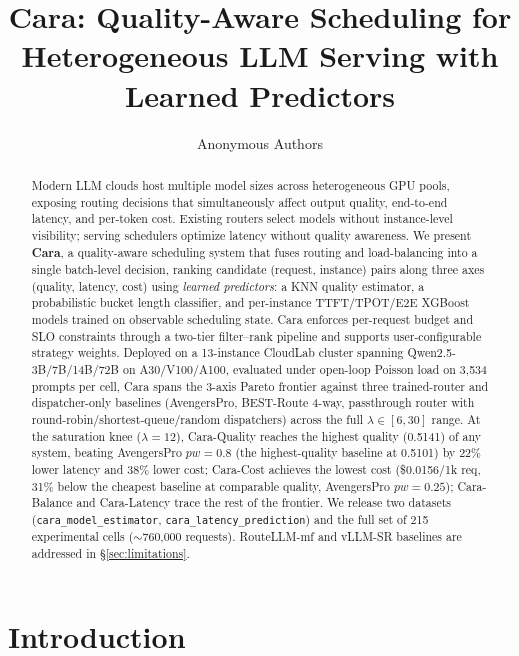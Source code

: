 \documentclass[10pt]{article}
\title{Cara: Quality-Aware Scheduling for Heterogeneous LLM Serving with Learned Predictors}
\author{Anonymous Authors}
\date{}
\begin{document}
\maketitle

\begin{abstract}
Modern LLM clouds host multiple model sizes across heterogeneous GPU pools, exposing routing decisions that simultaneously affect output quality, end-to-end latency, and per-token cost. Existing routers select models without instance-level visibility; serving schedulers optimize latency without quality awareness. We present \textbf{Cara}, a quality-aware scheduling system that fuses routing and load-balancing into a single batch-level decision, ranking candidate (request, instance) pairs along three axes (quality, latency, cost) using \emph{learned predictors}: a KNN quality estimator, a probabilistic bucket length classifier, and per-instance TTFT/TPOT/E2E XGBoost models trained on observable scheduling state. Cara enforces per-request budget and SLO constraints through a two-tier filter–rank pipeline and supports user-configurable strategy weights. Deployed on a 13-instance CloudLab cluster spanning Qwen2.5-3B/7B/14B/72B on A30/V100/A100, evaluated under open-loop Poisson load on 3{,}534 prompts per cell, Cara spans the 3-axis Pareto frontier against three trained-router and dispatcher-only baselines (AvengersPro, BEST-Route 4-way, passthrough router with round-robin/shortest-queue/random dispatchers) across the full $\lambda \in [6,30]$ range. At the saturation knee ($\lambda{=}12$), Cara-Quality reaches the highest quality (0.5141) of any system, beating AvengersPro $pw{=}0.8$ (the highest-quality baseline at 0.5101) by 22\% lower latency and 38\% lower cost; Cara-Cost achieves the lowest cost (\$0.0156/1k req, 31\% below the cheapest baseline at comparable quality, AvengersPro $pw{=}0.25$); Cara-Balance and Cara-Latency trace the rest of the frontier. We release two datasets (\texttt{cara\_model\_estimator}, \texttt{cara\_latency\_prediction}) and the full set of 215 experimental cells (\(\sim\)760{,}000 requests). RouteLLM-mf and vLLM-SR baselines are addressed in §\ref{sec:limitations}.
\end{abstract}

\section{Introduction}\label{sec:intro}
\end{document}
